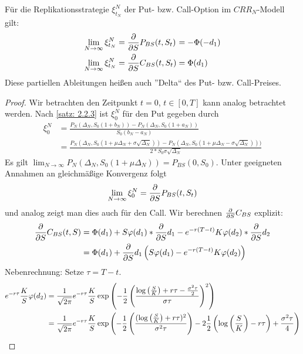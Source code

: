\begin{theorem}
	Für die Replikationsstrategie $\xi_{t_N}^N$ der Put- bzw. Call-Option im $CRR_N$-Modell gilt:
	\begin{equation*}
		\begin{alignedat}{2}
			\lim_{N \to \infty} \xi_{t_N}^N &= \frac{\partial}{\partial S } P_{BS}(t,S_t) &&= -\Phi(-d_1) \\
			\lim_{N \to \infty} \xi_{t_N}^N &= \frac{\partial}{\partial S } C_{BS}(t,S_t) &&= \Phi(d_1)
		\end{alignedat}
	\end{equation*}
	Diese partiellen Ableitungen heißen auch ''Delta`` des Put- bzw. Call-Preises.
\end{theorem}
\begin{proof}
	Wir betrachten den Zeitpunkt $t = 0$, $t \in [0,T]$ kann analog betrachtet werden.
	Nach \cref{satz: 2.2.3} ist $\xi_0^N$ für den Put gegeben durch
	\begin{equation*}
		\begin{aligned}
			\xi_0^N &= \frac{P_N(\Delta_N, S_0(1+b_N)) - P_N(\Delta_N, S_0 (1+a_N))}{S_0 (b_N - a_N)} \\
			&= \frac{P_N(\Delta_N, S_0(1 + \mu \Delta_N + \sigma \sqrt{\Delta_N})) - P_N (\Delta_N, S_0 (1+ \mu \Delta_N - \sigma \sqrt{\Delta_N})))}{2 * S_0 \sigma \sqrt{\Delta_N}}
		\end{aligned}
	\end{equation*}
	Es gilt $\lim_{N \to \infty} P_N(\Delta_N, S_0 (1 + \mu \Delta_N)) = P_{BS}(0,S_0)$. Unter geeigneten Annahmen an gleichmäßige Konvergenz folgt 
	\begin{equation*}
		\lim_{N \to \infty} \xi_0^N = \frac{\partial}{\partial S } P_{BS} (t, S_t)
	\end{equation*}
	und analog zeigt man dies auch für den Call.
	Wir berechnen $\frac{\partial}{\partial S } C_{BS}$ explizit:
	\begin{align*}
		\frac{\partial}{\partial S } C_{BS}(t,S) &= \Phi(d_1) + S \varphi(d_1) * \frac{\partial}{\partial S } d_1 - e^{-r(T-t)} K \varphi(d_2) * \frac{\partial}{\partial S } d_2 \\
		&= \Phi(d_1) + \frac{\partial}{\partial S } d_1 \left( S \varphi(d_1) - e^{-r(T-t)} K \varphi(d_2) \right)
	\end{align*}
	Nebenrechnung: Setze $\tau = T - t$.
	\begin{align*}
		e^{-r \tau} \frac{K}{S} \phi(d_2) &= \frac{1}{\sqrt{2\pi}} e^{-r \tau} \frac{K}{S} \exp \brackets{-\frac{1}{2} \brackets{\frac{\log\brackets{\frac{S}{K}} + r \tau - \frac{\sigma^2 \tau}{2}}{\sigma \tau}}^2} \\
		&= \frac{1}{\sqrt{2\pi}} e^{-r \tau} \frac{K}{S} \exp\brackets{-\frac{1}{2} \brackets{\frac{(\log\brackets{\frac{S}{K}} + r \tau)^2}{\sigma^2 \tau}} - 2 \frac{1}{2} \brackets{\log\brackets{\frac{S}{K}} - r \tau} + \frac{\sigma^2 \tau}{4}} \\

\end{align*}
\end{proof}
